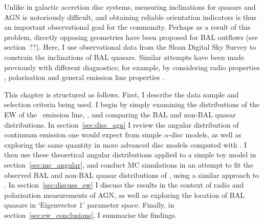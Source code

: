 Unlike in galactic accretion disc systems, measuring inclinations
for quasars and AGN is notoriously difficult, and obtaining 
reliable orientation indicators is thus an important observational
goal for the community. Perhaps as a result of this problem, 
directly opposing geometries have been proposed for 
BAL outflows (see section~??). Here, I use observational 
data from the Sloan Digital Sky Survey to constrain the inclinations
of BAL quasars. Similar attempts have been made previously with
different diagnostics; for example, by considering 
radio properties \citep{zhou2006,dipompeo2012a}, 
polarisation \citep{brotherton2006}
and general emission line properties \citep{dipompeo2012b}.  

This chapter is structured as follows. First, I describe
the data sample and selection criteria being used. I begin by
simply examining the distributions of the EW of the \oiiifull\ emission line,
\ewo, and comparing the BAL and non-BAL quasar distributions. 
In section~\ref{sec:disc_agn} I review the angular distribution of 
continuum emission one would expect from simple $\alpha$-disc models, 
as well as exploring the same quantity in more advanced disc models computed
with \agn. I then use these theoretical 
angular distributions applied to a simple toy model in 
section~\ref{sec:mc_angular},
and conduct MC simulations in an attempt to fit the observed BAL and non-BAL
quasar distributions of \ewo, using a similar approach to 
\citet[][hereafter R11]{risaliti2011}. 
In section~\ref{sec:discuss_ew} I discuss the results
in the context of radio and polarisation measurements of AGN, as well
as exploring the location of BAL quasars in `Eigenvector 1' parameter space.
Finally, in section~\ref{sec:ew_conclusions}, I summarise the findings.


